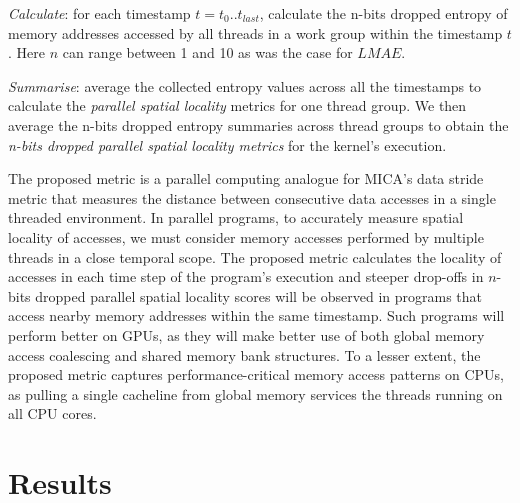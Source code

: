 \documentclass[review=false, sigchi]{acmart}
\begin{document}
	\textit{Calculate}: for each timestamp $t = t_0 .. t_{last}$, calculate the n-bits dropped entropy of memory addresses accessed by all threads in a work group within the timestamp $t$. Here $n$ can range between 1 and 10 as was the case for $LMAE$.
	
	\textit{Summarise}: average the collected entropy values across all the timestamps to calculate the \emph{parallel spatial locality} metrics for one thread group. We then average the n-bits dropped entropy summaries across thread groups to obtain the \textit{n-bits dropped parallel spatial locality metrics} for the kernel's execution.
	
	

	The proposed metric is a parallel computing analogue for MICA's data stride metric that measures the distance between consecutive data accesses in a single threaded environment. 
	In parallel programs, to accurately measure spatial locality of accesses, we must consider memory accesses performed by multiple threads in a close temporal scope. 
	The proposed metric calculates the locality of accesses in each time step of the program's execution and steeper drop-offs in $n$-bits dropped parallel spatial locality scores will be observed in programs that access nearby memory addresses within the same timestamp.
	Such programs will perform better on GPUs, as they will make better use of both global memory access coalescing and shared memory bank structures.
	To a lesser extent, the proposed metric captures performance-critical memory access patterns on CPUs, as pulling a single cacheline from global memory services the threads running on all CPU cores. %
	
	\section{Results} \label{results}
	
\end{document}
